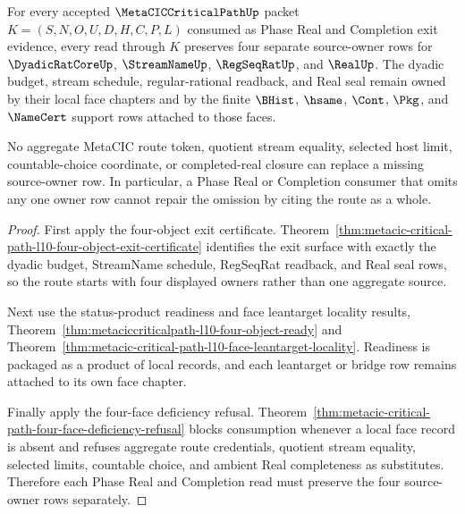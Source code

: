 \begin{theorem}
\label{thm:metacic-critical-path-l10-source-owner-blocker}
For every accepted $\MetaCICCriticalPathUp$ packet $K=(S,N,O,U,D,H,C,P,L)$ consumed as Phase Real and Completion exit evidence, every read through $K$ preserves four separate source-owner rows for $\DyadicRatCoreUp$, $\StreamNameUp$, $\RegSeqRatUp$, and $\RealUp$. The dyadic budget, stream schedule, regular-rational readback, and Real seal remain owned by their local face chapters and by the finite $\BHist$, $\hsame$, $\Cont$, $\Pkg$, and $\NameCert$ support rows attached to those faces.

No aggregate MetaCIC route token, quotient stream equality, selected host limit, countable-choice coordinate, or completed-real closure can replace a missing source-owner row. In particular, a Phase Real or Completion consumer that omits any one owner row cannot repair the omission by citing the route as a whole.
\end{theorem}
\begin{proof}
First apply the four-object exit certificate. Theorem~\ref{thm:metacic-critical-path-l10-four-object-exit-certificate} identifies the exit surface with exactly the dyadic budget, StreamName schedule, RegSeqRat readback, and Real seal rows, so the route starts with four displayed owners rather than one aggregate source.

Next use the status-product readiness and face leantarget locality results, Theorem~\ref{thm:metaciccriticalpath-l10-four-object-ready} and Theorem~\ref{thm:metacic-critical-path-l10-face-leantarget-locality}. Readiness is packaged as a product of local records, and each leantarget or bridge row remains attached to its own face chapter.

Finally apply the four-face deficiency refusal. Theorem~\ref{thm:metacic-critical-path-four-face-deficiency-refusal} blocks consumption whenever a local face record is absent and refuses aggregate route credentials, quotient stream equality, selected limits, countable choice, and ambient Real completeness as substitutes. Therefore each Phase Real and Completion read must preserve the four source-owner rows separately.
\end{proof}

